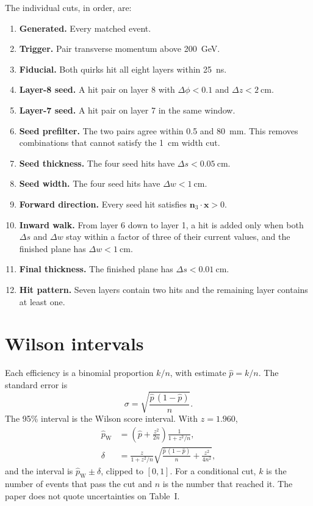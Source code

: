 \documentclass[11pt,a4paper]{article}
\begin{document}
The individual cuts, in order, are:
\begin{enumerate}
\item \textbf{Generated.} Every matched event.
\item \textbf{Trigger.} Pair transverse momentum above \SI{200}{\GeV}.
\item \textbf{Fiducial.} Both quirks hit all eight layers within \SI{25}{\ns}.
\item \textbf{Layer-8 seed.} A hit pair on layer 8 with \(\Delta\phi < 0.1\) and \(\Delta z < \SI{2}{\cm}\).
\item \textbf{Layer-7 seed.} A hit pair on layer 7 in the same window.
\item \textbf{Seed prefilter.} The two pairs agree within \SI{0.5}{\rad} and \SI{80}{\mm}. This removes combinations that cannot satisfy the \SI{1}{\cm} width cut.
\item \textbf{Seed thickness.} The four seed hits have \(\Delta s < \SI{0.05}{\cm}\).
\item \textbf{Seed width.} The four seed hits have \(\Delta w < \SI{1}{\cm}\).
\item \textbf{Forward direction.} Every seed hit satisfies \(\boldsymbol{n}_3\cdot\boldsymbol{x} > 0\).
\item \textbf{Inward walk.} From layer 6 down to layer 1, a hit is added only when both \(\Delta s\) and \(\Delta w\) stay within a factor of three of their current values, and the finished plane has \(\Delta w < \SI{1}{\cm}\).
\item \textbf{Final thickness.} The finished plane has \(\Delta s < \SI{0.01}{\cm}\).
\item \textbf{Hit pattern.} Seven layers contain two hits and the remaining layer contains at least one.
\end{enumerate}

\section{Wilson intervals}
Each efficiency is a binomial proportion \(k/n\), with estimate \(\hat{p} = k/n\).
The standard error is
\begin{equation}
\sigma = \sqrt{\frac{\hat{p}\,(1-\hat{p})}{n}}.
\label{eq:se}
\end{equation}
The 95\% interval is the Wilson score interval. With \(z = 1.960\),
\begin{equation}
\begin{aligned}
\hat{p}_{\mathrm{W}}
&=
\left(\hat{p} + \frac{z^{2}}{2n}\right)
\frac{1}{1 + z^{2}/n},
\\
\delta
&=
\frac{z}{1 + z^{2}/n}
\sqrt{
  \frac{\hat{p}\,(1-\hat{p})}{n}
  + \frac{z^{2}}{4n^{2}}
},
\end{aligned}
\label{eq:wilson}
\end{equation}
and the interval is \(\hat{p}_{\mathrm{W}} \pm \delta\), clipped to \([0,1]\).
For a conditional cut, \(k\) is the number of events that pass the cut and \(n\) is the number that reached it.
The paper does not quote uncertainties on Table~I.
\end{document}
